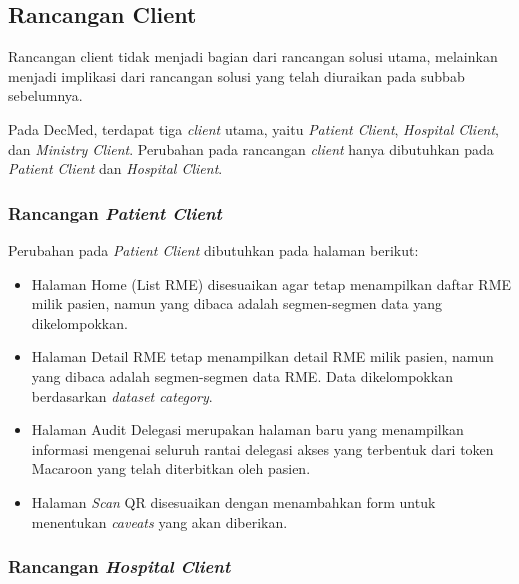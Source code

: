 \subsection{Rancangan Client}
\label{subsec:rancangan-client}

Rancangan client tidak menjadi bagian dari rancangan solusi utama, melainkan menjadi implikasi dari rancangan solusi yang telah diuraikan pada subbab sebelumnya.

Pada DecMed, terdapat tiga \textit{client} utama, yaitu \textit{Patient Client}, \textit{Hospital Client}, dan \textit{Ministry Client}. Perubahan pada rancangan \textit{client} hanya dibutuhkan pada \textit{Patient Client} dan \textit{Hospital Client}.

\subsubsection{Rancangan \textit{Patient Client}}
\label{subsubsec:rancangan-patient-client}

Perubahan pada \textit{Patient Client} dibutuhkan pada halaman berikut:

\begin{itemize}
	\item Halaman Home (List RME) disesuaikan agar tetap menampilkan daftar RME milik pasien, namun yang dibaca adalah segmen-segmen data yang dikelompokkan.
	\item Halaman Detail RME tetap menampilkan detail RME milik pasien, namun yang dibaca adalah segmen-segmen data RME. Data dikelompokkan berdasarkan \textit{dataset category}.
	\item Halaman Audit Delegasi merupakan halaman baru yang menampilkan informasi mengenai seluruh rantai delegasi akses yang terbentuk dari token Macaroon yang telah diterbitkan oleh pasien.
	\item Halaman \textit{Scan} QR disesuaikan dengan menambahkan form untuk menentukan \textit{caveats} yang akan diberikan.
\end{itemize}

\subsubsection{Rancangan \textit{Hospital Client}}
\label{subsubsec:rancangan-hospital-client}

